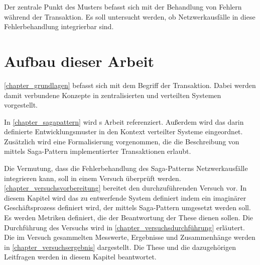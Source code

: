Der zentrale Punkt des Musters befasst sich mit der Behandlung von Fehlern während der Transaktion. Es soll untersucht werden, ob Netzwerkausfälle in diese Fehlerbehandlung integrierbar sind.

\section{Aufbau dieser Arbeit}
\cref{chapter_grundlagen} befasst sich mit dem Begriff der Transaktion. Dabei werden damit verbundene Konzepte in zentralisierten und verteilten Systemen vorgestellt.

In \cref{chapter_sagapattern} wird \citeauthor{GarciaMolina.1987}s Arbeit  referenziert. Außerdem wird das darin definierte Entwicklungsmuster in den Kontext verteilter Systeme eingeordnet. Zusätzlich wird eine Formalisierung vorgenommen, die die Beschreibung von mittels Saga-Pattern implementierter Transaktionen erlaubt. 

Die Vermutung, dass die Fehlerbehandlung des Saga-Patterns Netzwerkausfälle integrieren kann, soll in einem Versuch überprüft werden. \cref{chapter_versuchsvorbereitung} bereitet den durchzuführenden Versuch vor. In diesem Kapitel wird das zu entwerfende System definiert indem ein imaginärer Geschäftsprozess definiert wird, der mittels Saga-Pattern umgesetzt werden soll. Es werden Metriken definiert, die der Beantwortung der These dienen sollen. Die Durchführung des Versuchs wird in \cref{chapter_versuchsdurchführung} erläutert. Die im Versuch gesammelten Messwerte, Ergebnisse und Zusammenhänge werden in \cref{chapter_versuchsergebnis} dargestellt. Die These und die dazugehörigen Leitfragen werden in diesem Kapitel beantwortet. 











